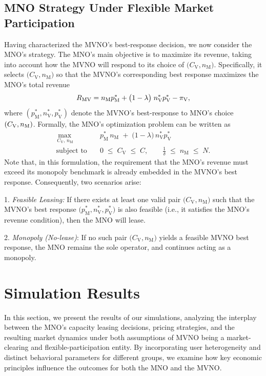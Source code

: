 \documentclass[12pt, draftclsnofoot, onecolumn]{IEEEtran}
\begin{document}
		\subsection{MNO Strategy Under Flexible Market Participation}
		Having characterized the MVNO’s best‐response decision, we now consider the MNO’s strategy. The MNO’s main objective is to maximize its revenue, taking into account how the MVNO will respond to its choice of \(\bigl(C_{\mathrm{V}},n_{\mathrm{M}}\bigr)\). Specifically, it selects \(\bigl(C_{\mathrm{V}},n_{\mathrm{M}}\bigr)\) so that the MVNO’s corresponding best response maximizes the MNO’s total revenue
		\[
		R_{\rm MV}=n_{\mathrm{M}} p^*_{\mathrm{M}}+
		\bigl(1-\lambda\bigr)\;
		n^*_{\mathrm{V}} p^*_{\mathrm{V}}-\pi_{\rm V},
		\]
		where $\left(p^*_{\mathrm{M}}, n^*_{\mathrm{V}}, p^*_{\mathrm{V}}\right)$
		denote the MVNO’s best-response to MNO's choice $(C_{\rm V}, n_{\rm M})$. Formally, the MNO’s optimization problem can be written as
		\begin{equation}
			\label{eq:MNO_optimization}
			\begin{aligned}
				\max_{\,C_{\mathrm{V}},\,n_{\mathrm{M}}}
				&\quad
				p_{\mathrm{M}}^*\,n_{\mathrm{M}}
				\;+\;
				\bigl(1-\lambda\bigr)\,
				n_{\mathrm{V}}^*
				p^*_{\mathrm{V}}
				\\[6pt]
				\text{subject to}
				&\quad
				0 \;\le\; C_{\mathrm{V}} \;\le\; C,\quad \quad
				\frac{1}{\delta}\;\le\;n_{\mathrm{M}}\;\le\;N.
			\end{aligned}
		\end{equation}
		Note that, in this formulation, the requirement that the MNO’s revenue must exceed its monopoly benchmark is already embedded in the MVNO’s best response. Consequently, two scenarios arise:
		
		1. \textit{Feasible Leasing:} If there exists at least one valid pair \(\bigl(C_{\mathrm{V}}, n_{\mathrm{M}}\bigr)\) such that the MVNO’s best response \(\bigl(p^*_{\mathrm{M}}, n^*_{\mathrm{V}}, p^*_{\mathrm{V}}\bigr)\) is also feasible (i.e., it satisfies the MNO’s revenue condition), then the MNO will lease.
		
		2. \textit{Monopoly (No-lease)}: If no such pair \(\bigl(C_{\mathrm{V}}, n_{\mathrm{M}}\bigr)\) yields a feasible MVNO best response, the MNO remains the sole operator, and continues acting as a monopoly.
		
			\vspace{-.5cm}
		
		\section{Simulation Results}
		In this section, we present the results of our simulations, analyzing the interplay between the MNO's capacity leasing decisions, pricing strategies, and the resulting market dynamics under both assumptions of MVNO being a market-clearing and flexible-participation entity. By incorporating user heterogeneity and distinct behavioral parameters for different groups, we examine how key economic principles influence the outcomes for both the MNO and the MVNO.
		
\end{document}
